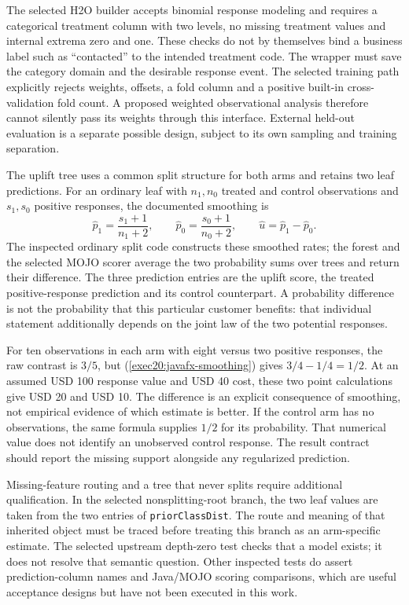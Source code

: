 The selected H2O builder accepts binomial response modeling and requires a
categorical treatment column with two levels, no missing treatment values and
internal extrema zero and one. These checks do not by themselves bind a
business label such as ``contacted'' to the intended treatment code. The
wrapper must save the category domain and the desirable response event.
The selected training path explicitly rejects weights, offsets, a fold column
and a positive built-in cross-validation fold count. A proposed weighted
observational analysis therefore cannot silently pass its weights through this
interface. External held-out evaluation is a separate possible design, subject
to its own sampling and training separation.
\citep{exec20_javaeffects_h2o}

The uplift tree uses a common split structure for both arms and retains two
leaf predictions. For an ordinary leaf with $n_1,n_0$ treated and control
observations and $s_1,s_0$ positive responses, the documented smoothing is
\begin{equation}
 \widehat p_1=\frac{s_1+1}{n_1+2},\qquad
 \widehat p_0=\frac{s_0+1}{n_0+2},\qquad
 \widehat u=\widehat p_1-\widehat p_0.
 \label{exec20:javafx-smoothing}
\end{equation}
The inspected ordinary split code constructs these smoothed rates; the forest
and the selected MOJO scorer average the two probability sums over trees and
return their difference. The three prediction entries are the uplift score,
the treated positive-response prediction and its control counterpart. A
probability difference is not the probability that this particular customer
benefits: that individual statement additionally depends on the joint law of
the two potential responses.
\citep{exec20_javaeffects_h2o}

For ten observations in each arm with eight versus two positive responses,
the raw contrast is $3/5$, but (\ref{exec20:javafx-smoothing}) gives
$3/4-1/4=1/2$. At an assumed USD 100 response value and USD 40 cost, these
two point calculations give USD 20 and USD 10. The difference is an explicit
consequence of smoothing, not empirical evidence of which estimate is better.
If the control arm has no observations, the same formula supplies $1/2$ for
its probability. That numerical value does not identify an unobserved control
response. The result contract should report the missing support alongside any
regularized prediction.
\citep{exec20_javaeffects_reference}

Missing-feature routing and a tree that never splits require additional
qualification. In the selected nonsplitting-root branch, the two leaf values
are taken from the two entries of \texttt{priorClassDist}. The route and
meaning of that inherited object must be traced before treating this branch
as an arm-specific estimate. The selected upstream depth-zero test checks that
a model exists; it does not resolve that semantic question. Other inspected
tests do assert prediction-column names and Java/MOJO scoring comparisons,
which are useful acceptance designs but have not been executed in this work.
\citep{exec20_javaeffects_h2o}

